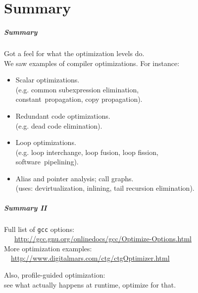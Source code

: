 \documentclass[aspectratio=43]{beamer}
\newenvironment{changemargin}[1]{%
  \begin{list}{}{%
    \setlength{\topsep}{0pt}%
    \setlength{\leftmargin}{#1}%
    \setlength{\rightmargin}{1em}
    \setlength{\listparindent}{\parindent}%
    \setlength{\itemindent}{\parindent}%
    \setlength{\parsep}{\parskip}%
  }%
  \item[]}{\end{list}}
\begin{document}
\part{Summary}
\frame{\partpage}

\begin{frame}
  \frametitle{Summary}

  \begin{changemargin}{1cm}
    Got a feel for what the optimization levels do.\\
    We saw examples of compiler optimizations. For instance:
\begin{itemize}
\item Scalar optimizations. \\
(e.g. common subexpression elimination,\\ \quad constant~propagation, copy propagation).
\item Redundant code optimizations.\\
(e.g. dead code elimination).
\item Loop optimizations.\\
(e.g. loop interchange, loop fusion, loop fission, \\ \quad software~pipelining).
\item Alias and pointer analysis; call graphs.\\
(uses: devirtualization, inlining, tail recursion elimination).
\end{itemize}
  \end{changemargin}


\end{frame}

\begin{frame}
  \frametitle{Summary II}

  \begin{changemargin}{0.5cm}
     Full list of {\tt gcc} options: \\ ~~~{\small \url{http://gcc.gnu.org/onlinedocs/gcc/Optimize-Options.html}}\\
      More optimization examples: \\ ~~\url{http://www.digitalmars.com/ctg/ctgOptimizer.html}\\[1em]
  \end{changemargin}
  \begin{changemargin}{1.5cm}

     Also, profile-guided optimization:\\
\qquad see what actually happens at runtime, optimize for that.
  \end{changemargin}
\end{frame}
\end{document}
